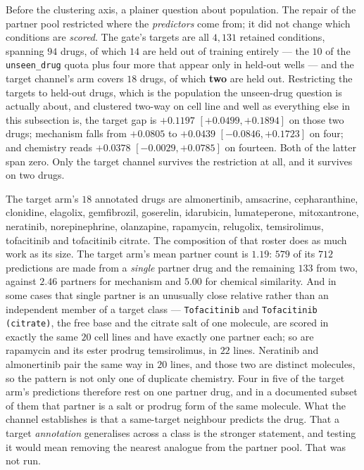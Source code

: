 Before the clustering axis, a plainer question about population. The repair of the partner pool
restricted where the \emph{predictors} come from; it did not change which conditions are
\emph{scored}. The gate's targets are all $4{,}131$ retained conditions, spanning $94$ drugs, of
which $14$ are held out of training entirely --- the $10$ of the \texttt{unseen\_drug} quota plus
four more that appear only in held-out wells --- and the target channel's arm covers $18$ drugs, of
which \textbf{two} are held out. Restricting the targets to held-out drugs, which is the population
the unseen-drug question is actually about, and clustered two-way on cell line and well as
everything else in this subsection is, the target gap is
$+0.1197$ \nolinebreak[3]$[+0.0499, +0.1894]$ on those two drugs; mechanism falls from $+0.0805$ to
$+0.0439$ \nolinebreak[3]$[-0.0846, +0.1723]$ on four; and chemistry reads
$+0.0378$ \nolinebreak[3]$[-0.0029, +0.0785]$ on fourteen. Both of the latter span zero. Only the
target channel survives the restriction at all, and it survives on two drugs.

The target arm's $18$ annotated drugs are almonertinib, amsacrine, cepharanthine, clonidine, elagolix, gemfibrozil, goserelin,
idarubicin, lumateperone, mitoxantrone, neratinib, norepinephrine, olanzapine, rapamycin,
relugolix, temsirolimus, tofacitinib and tofacitinib citrate. The composition of that roster does
as much work as its size. The target arm's mean partner count is $1.19$: $579$ of its $712$
predictions are made from a \emph{single} partner drug and the remaining $133$ from two, against
$2.46$ partners for mechanism and $5.00$ for chemical similarity. And in some cases that single
partner is an unusually close relative rather than an independent member of a target class ---
\texttt{Tofacitinib} and \texttt{Tofacitinib (citrate)}, the free base and the citrate salt of one
molecule, are scored in exactly the same $20$ cell lines and have exactly one partner each; so are
rapamycin and its ester prodrug temsirolimus, in $22$ lines. Neratinib and almonertinib pair the
same way in $20$ lines, and those two are distinct molecules, so the pattern is not only one of
duplicate chemistry. Four in five of the target arm's predictions therefore rest on one partner
drug, and in a documented subset of them that partner is a salt or prodrug form of the same
molecule. What the channel establishes is that a same-target neighbour predicts the drug. That a
target \emph{annotation} generalises across a class is the stronger statement, and testing it would
mean removing the nearest analogue from the partner pool. That was not run.

